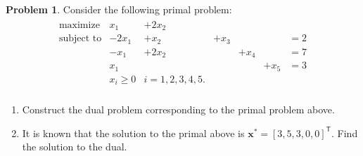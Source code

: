 \documentclass[12pt]{article}
\theoremstyle{definition}
\newtheorem{problem}{Problem}
\newcommand{\vc}[1]{\boldsymbol{#1}}
\newcommand{\tran}{\mathsf{T}}
\begin{document}
\begin{problem}
  Consider the following primal problem:
  \begin{align*}
    \begin{array}{rllllll}
      \text{maximize} & x_1 &+ 2x_2 & & & & \\
      \text{subject to} & -2x_1 &+ x_2 &+ x_3 & & &= 2 \\
      & -x_1 &+ 2x_2& &+ x_4 & &= 7 \\
      & x_1 &&& &+ x_5 &= 3 \\
      &x_i \geq 0 & i= 1,2,3,4,5.& & & \\
    \end{array}
  \end{align*}
  \begin{enumerate}
    \item Construct the dual problem corresponding to the primal problem above.
    \item It is known that the solution to the primal above is $\vc{x}^{*} = [3,5,3,0,0]^\tran$.
      Find the solution to the dual.
  \end{enumerate}
\end{problem}
\end{document}
